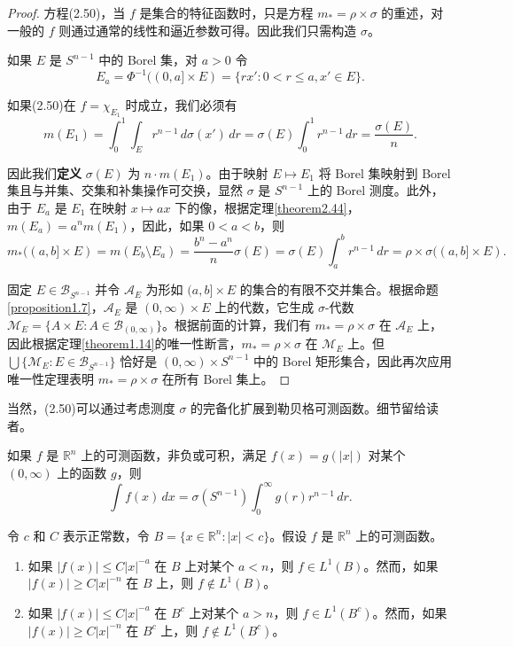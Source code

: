 \documentclass[lang=cn,10pt,thmcnt=section]{elegantbook}
\begin{document}
\begin{proof}
方程(2.50)，当 $f$ 是集合的特征函数时，只是方程 $m_* = \rho \times \sigma$ 的重述，对一般的 $f$ 则通过通常的线性和逼近参数可得。因此我们只需构造 $\sigma$。

如果 $E$ 是 $S^{n-1}$ 中的 Borel 集，对 $a > 0$ 令
\[E_a = \Phi^{-1}((0,a] \times E) = \{rx' : 0 < r \leq a, x' \in E\}.\]

如果(2.50)在 $f = \chi_{E_1}$ 时成立，我们必须有
\[m(E_1) = \int_0^1 \int_E r^{n-1}\,d\sigma(x')\,dr = \sigma(E)\int_0^1 r^{n-1}\,dr = \frac{\sigma(E)}{n}.\]

因此我们\textbf{定义} $\sigma(E)$ 为 $n \cdot m(E_1)$。由于映射 $E \mapsto E_1$ 将 Borel 集映射到 Borel 集且与并集、交集和补集操作可交换，显然 $\sigma$ 是 $S^{n-1}$ 上的 Borel 测度。此外，由于 $E_a$ 是 $E_1$ 在映射 $x \mapsto ax$ 下的像，根据定理\ref{theorem2.44}，$m(E_a) = a^nm(E_1)$，因此，如果 $0 < a < b$，则
\[m_*((a,b] \times E) = m(E_b \setminus E_a) = \frac{b^n - a^n}{n}\sigma(E) = \sigma(E)\int_a^b r^{n-1}\,dr = \rho \times \sigma((a,b] \times E).\]

固定 $E \in \mathcal{B}_{S^{n-1}}$ 并令 $\mathcal{A}_E$ 为形如 $(a,b] \times E$ 的集合的有限不交并集合。根据命题\ref{proposition1.7}，$\mathcal{A}_E$ 是 $(0,\infty) \times E$ 上的代数，它生成 $\sigma$-代数 $\mathcal{M}_E = \{A \times E : A \in \mathcal{B}_{(0,\infty)}\}$。根据前面的计算，我们有 $m_* = \rho \times \sigma$ 在 $\mathcal{A}_E$ 上，因此根据定理\ref{theorem1.14}的唯一性断言，$m_* = \rho \times \sigma$ 在 $\mathcal{M}_E$ 上。但 $\bigcup\{\mathcal{M}_E : E \in \mathcal{B}_{S^{n-1}}\}$ 恰好是 $(0,\infty) \times S^{n-1}$ 中的 Borel 矩形集合，因此再次应用唯一性定理表明 $m_* = \rho \times \sigma$ 在所有 Borel 集上。
\end{proof}

当然，(2.50)可以通过考虑测度 $\sigma$ 的完备化扩展到勒贝格可测函数。细节留给读者。

\begin{corollary}\label{corollary2.51}
如果 $f$ 是 $\mathbb{R}^n$ 上的可测函数，非负或可积，满足 $f(x) = g(|x|)$ 对某个 $(0,\infty)$ 上的函数 $g$，则
\[\int f(x)\,dx = \sigma(S^{n-1})\int_0^\infty g(r)r^{n-1}\,dr.\]
\end{corollary}

\begin{corollary}\label{corollary2.52}
令 $c$ 和 $C$ 表示正常数，令 $B = \{x \in \mathbb{R}^n : |x| < c\}$。假设 $f$ 是 $\mathbb{R}^n$ 上的可测函数。
\begin{enumerate}[label=\alph*.]
\item 如果 $|f(x)| \leq C|x|^{-a}$ 在 $B$ 上对某个 $a < n$，则 $f \in L^1(B)$。然而，如果 $|f(x)| \geq C|x|^{-n}$ 在 $B$ 上，则 $f \notin L^1(B)$。
\item 如果 $|f(x)| \leq C|x|^{-a}$ 在 $B^c$ 上对某个 $a > n$，则 $f \in L^1(B^c)$。然而，如果 $|f(x)| \geq C|x|^{-n}$ 在 $B^c$ 上，则 $f \notin L^1(B^c)$。
\end{enumerate}
\end{corollary}
\end{document}
